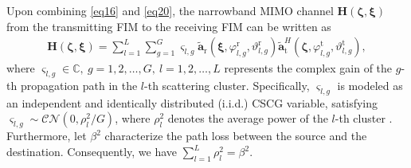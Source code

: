 \documentclass[lettersize,journal]{IEEEtran}
\begin{document}
Upon combining \eqref{eq16} and \eqref{eq20}, the narrowband MIMO channel $\mathbf{H}\left ( \boldsymbol{\zeta},\boldsymbol{\xi} \right )$ from the transmitting FIM to the receiving FIM can be written as
\begin{align}\label{eq21}
 \mathbf{H}\left ( \boldsymbol{\zeta},\boldsymbol{\xi} \right )=\sum_{l=1}^{L}\sum_{g=1}^{G}\varsigma _{l,g}\tilde{\mathbf{a}}_{\textrm{r}}\left ( \boldsymbol{\xi}, \varphi_{l,g}^{\textrm{r}}, \vartheta_{l,g}^{\textrm{r}} \right )\tilde{\mathbf{a}}_{\textrm{t}}^{H}\left ( \boldsymbol{\zeta}, \varphi_{l,g}^{\textrm{t}}, \vartheta_{l,g}^{\textrm{t}} \right ),
\end{align}
where $\varsigma _{l,g} \in \mathbb{C},\ g=1,2,\ldots,G,\ l=1,2,\ldots,L$ represents the complex gain of the $g$-th propagation path in the $l$-th scattering cluster. Specifically, $\varsigma _{l,g}$ is modeled as an independent and identically distributed (i.i.d.) CSCG variable, satisfying $\varsigma _{l, g}\sim \mathcal{CN}\left ( 0,\rho _{l}^{2}/G \right )$, where $\rho _{l}^{2}$ denotes the average power of the $l$-th cluster \cite{TWC_2014_Ayach_Spatially}. Furthermore, let $\beta^{2}$ characterize the path loss between the source and the destination. Consequently, we have $\sum\nolimits_{l=1}^{L}\rho _{l}^{2}=\beta^{2}$.
\end{document}
